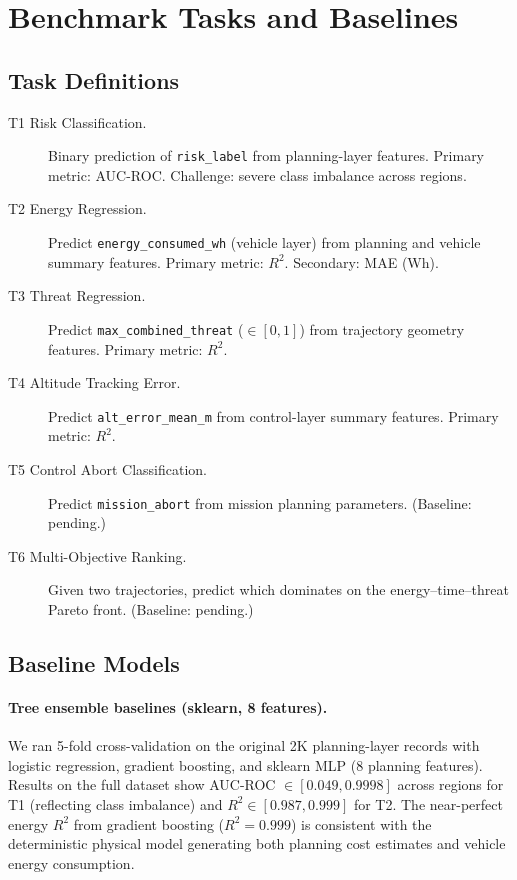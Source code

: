 \documentclass{article}
\begin{document}
\section{Benchmark Tasks and Baselines}
\label{sec:benchmarks}

\subsection{Task Definitions}

\begin{description}
  \item[T1 Risk Classification.] Binary prediction of \texttt{risk\_label}
    from planning-layer features. Primary metric: AUC-ROC.
    Challenge: severe class imbalance across regions.
  \item[T2 Energy Regression.] Predict \texttt{energy\_consumed\_wh}
    (vehicle layer) from planning and vehicle summary features.
    Primary metric: $R^2$. Secondary: MAE (Wh).
  \item[T3 Threat Regression.] Predict \texttt{max\_combined\_threat}
    ($\in [0,1]$) from trajectory geometry features.
    Primary metric: $R^2$.
  \item[T4 Altitude Tracking Error.] Predict \texttt{alt\_error\_mean\_m}
    from control-layer summary features. Primary metric: $R^2$.
  \item[T5 Control Abort Classification.] Predict \texttt{mission\_abort}
    from mission planning parameters. (Baseline: pending.)
  \item[T6 Multi-Objective Ranking.] Given two trajectories, predict
    which dominates on the energy--time--threat Pareto front.
    (Baseline: pending.)
\end{description}

\subsection{Baseline Models}

\paragraph{Tree ensemble baselines (sklearn, 8 features).}
We ran 5-fold cross-validation on the original 2K planning-layer records
with logistic regression, gradient boosting, and sklearn MLP (8 planning
features). Results on the full dataset \citep{baseline_experiments} show
AUC-ROC $\in [0.049, 0.9998]$ across regions for T1 (reflecting class
imbalance) and $R^2 \in [0.987, 0.999]$ for T2. The near-perfect energy
$R^2$ from gradient boosting ($R^2 = 0.999$) is consistent with the
deterministic physical model generating both planning cost estimates and
vehicle energy consumption.
\end{document}
